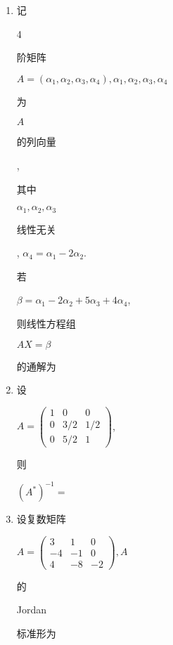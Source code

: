 \documentclass[10pt]{article}
\begin{document}
\begin{enumerate}
  \item \begin{CJK}{UTF8}{mj}记\end{CJK} 4 \begin{CJK}{UTF8}{mj}阶矩阵\end{CJK} $A=\left(\alpha_{1}, \alpha_{2}, \alpha_{3}, \alpha_{4}\right), \alpha_{1}, \alpha_{2}, \alpha_{3}, \alpha_{4}$ \begin{CJK}{UTF8}{mj}为\end{CJK} $A$ \begin{CJK}{UTF8}{mj}的列向量\end{CJK}, \begin{CJK}{UTF8}{mj}其中\end{CJK} $\alpha_{1}, \alpha_{2}, \alpha_{3}$ \begin{CJK}{UTF8}{mj}线性无关\end{CJK}, $\alpha_{4}=\alpha_{1}-2 \alpha_{2}$. \begin{CJK}{UTF8}{mj}若\end{CJK} $\beta=\alpha_{1}-2 \alpha_{2}+5 \alpha_{3}+4 \alpha_{4}$, \begin{CJK}{UTF8}{mj}则线性方程组\end{CJK} $A X=\beta$ \begin{CJK}{UTF8}{mj}的通解为\end{CJK}

  \item \begin{CJK}{UTF8}{mj}设\end{CJK} $A=\left(\begin{array}{ccc}1 & 0 & 0 \\ 0 & 3 / 2 & 1 / 2 \\ 0 & 5 / 2 & 1\end{array}\right)$, \begin{CJK}{UTF8}{mj}则\end{CJK} $\left(A^{*}\right)^{-1}=$

  \item \begin{CJK}{UTF8}{mj}设复数矩阵\end{CJK} $A=\left(\begin{array}{ccc}3 & 1 & 0 \\ -4 & -1 & 0 \\ 4 & -8 & -2\end{array}\right), A$ \begin{CJK}{UTF8}{mj}的\end{CJK} Jordan \begin{CJK}{UTF8}{mj}标准形为\end{CJK}

\end{enumerate}
\end{document}
